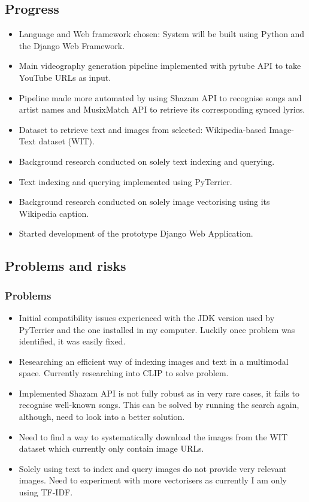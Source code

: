 \documentclass[11pt]{article}
\begin{document}
\subsection{Progress}\label{progress}
\begin{itemize}[noitemsep]
    \item Language and Web framework chosen: System will be built using Python and the Django Web Framework.
    \item Main videography generation pipeline implemented with pytube API to take YouTube URLs as input.
    \item Pipeline made more automated by using Shazam API to recognise songs and artist names and MusixMatch API to retrieve its corresponding synced lyrics.
    \item Dataset to retrieve text and images from selected: Wikipedia-based Image-Text dataset (WIT).
    \item Background research conducted on solely text indexing and querying.
    \item Text indexing and querying implemented using PyTerrier.
    \item Background research conducted on solely image vectorising using its Wikipedia caption.
    \item Started development of the prototype Django Web Application.
\end{itemize}


\subsection{Problems and risks}\label{problems-and-risks}
\subsubsection{Problems}\label{problems}
\begin{itemize}[noitemsep]
    \item Initial compatibility issues experienced with the JDK version used by PyTerrier and the one installed in my computer. Luckily once problem was identified, it was easily fixed.
    \item Researching an efficient way of indexing images and text in a multimodal space. Currently researching into CLIP to solve problem.
    \item Implemented Shazam API is not fully robust as in very rare cases, it fails to recognise well-known songs. This can be solved by running the search again, although, need to look into a better solution.
    \item Need to find a way to systematically download the images from the WIT dataset which currently only contain image URLs.
    \item Solely using text to index and query images do not provide very relevant images. Need to experiment with more vectorisers as currently I am only using TF-IDF.
\end{itemize}
\end{document}
